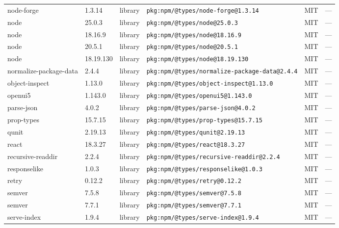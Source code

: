 \documentclass[11pt,a4paper]{article}
\begin{document}
\begin{longtable}{|p{4cm}|p{2cm}|p{1.6cm}|p{5cm}|p{1.5cm}|p{3.5cm}|}
\raggedright node-forge & 1.3.14 & library & \small\texttt{pkg:npm/@types/node-forge@1.3.14} & MIT & \small — \\
\raggedright node & 25.0.3 & library & \small\texttt{pkg:npm/@types/node@25.0.3} & MIT & \small — \\
\raggedright node & 18.16.9 & library & \small\texttt{pkg:npm/@types/node@18.16.9} & MIT & \small — \\
\raggedright node & 20.5.1 & library & \small\texttt{pkg:npm/@types/node@20.5.1} & MIT & \small — \\
\raggedright node & 18.19.130 & library & \small\texttt{pkg:npm/@types/node@18.19.130} & MIT & \small — \\
\raggedright normalize-package-data & 2.4.4 & library & \small\texttt{pkg:npm/@types/normalize-package-data@2.4.4} & MIT & \small — \\
\raggedright object-inspect & 1.13.0 & library & \small\texttt{pkg:npm/@types/object-inspect@1.13.0} & MIT & \small — \\
\raggedright openui5 & 1.143.0 & library & \small\texttt{pkg:npm/@types/openui5@1.143.0} & MIT & \small — \\
\raggedright parse-json & 4.0.2 & library & \small\texttt{pkg:npm/@types/parse-json@4.0.2} & MIT & \small — \\
\raggedright prop-types & 15.7.15 & library & \small\texttt{pkg:npm/@types/prop-types@15.7.15} & MIT & \small — \\
\raggedright qunit & 2.19.13 & library & \small\texttt{pkg:npm/@types/qunit@2.19.13} & MIT & \small — \\
\raggedright react & 18.3.27 & library & \small\texttt{pkg:npm/@types/react@18.3.27} & MIT & \small — \\
\raggedright recursive-readdir & 2.2.4 & library & \small\texttt{pkg:npm/@types/recursive-readdir@2.2.4} & MIT & \small — \\
\raggedright responselike & 1.0.3 & library & \small\texttt{pkg:npm/@types/responselike@1.0.3} & MIT & \small — \\
\raggedright retry & 0.12.2 & library & \small\texttt{pkg:npm/@types/retry@0.12.2} & MIT & \small — \\
\raggedright semver & 7.5.8 & library & \small\texttt{pkg:npm/@types/semver@7.5.8} & MIT & \small — \\
\raggedright semver & 7.7.1 & library & \small\texttt{pkg:npm/@types/semver@7.7.1} & MIT & \small — \\
\raggedright serve-index & 1.9.4 & library & \small\texttt{pkg:npm/@types/serve-index@1.9.4} & MIT & \small — \\

\end{longtable}
\end{document}
